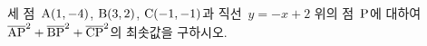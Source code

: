 세 점~$\mathrm{A}(1{,}\mkern3mu\mathopen{}-4)$, $\mathrm{B}(3{,}\mkern3mu\mathopen{}2)$, $\mathrm{C}(-1{,}\mkern3mu\mathopen{}-1)$과 직선~$y=-x+2$ 위의 점~$\mathrm{P}$에 대하여 $\overline{\mathrm{AP}}^2+\overline{\mathrm{BP}}^2+\overline{\mathrm{CP}}^2$의 최솟값을 구하시오.
